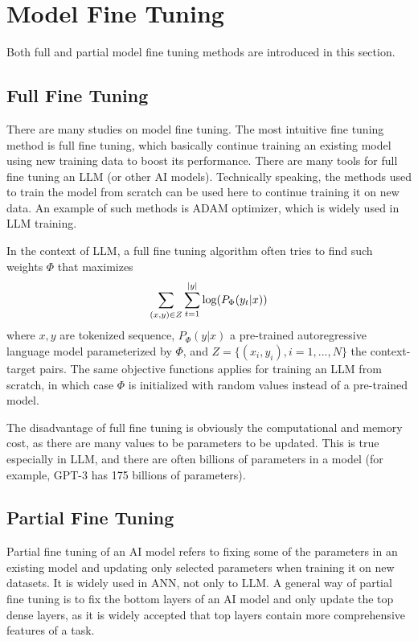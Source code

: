 \section{Model Fine Tuning}

Both full and partial model fine tuning methods are introduced in this section.

\subsection{Full Fine Tuning}

There are many studies on model fine tuning. The most intuitive fine tuning method is full fine tuning, which basically continue training an existing model using new training data to boost its performance. There are many tools for full fine tuning an LLM (or other AI models). Technically speaking, the methods used to train the model from scratch can be used here to continue training it on new data. An example of such methods is ADAM optimizer, which is widely used in LLM training.

In the context of LLM, a full fine tuning algorithm often tries to find such weights $\Phi$ that maximizes
\begin{eqnarray}
	\sum_{(x,y)\in Z}\sum_{t=1}^{|y|} \textup{log}(P_{\Phi}(y_t|x)) \nonumber
\end{eqnarray}
where $x, y$ are tokenized sequence, $P_{\Phi}(y|x)$ a pre-trained autoregressive language model parameterized by $\Phi$, and $Z=\{(x_i,y_i), i=1,...,N\}$ the context-target pairs. The same objective functions applies for training an LLM from scratch, in which case $\Phi$ is initialized with random values instead of a pre-trained model.

The disadvantage of full fine tuning is obviously the computational and memory cost, as there are many values to be parameters to be updated. This is true especially in LLM, and there are often billions of parameters in a model (for example, GPT-3 has 175 billions of parameters).

\subsection{Partial Fine Tuning}

Partial fine tuning of an AI model refers to fixing some of the parameters in an existing model and updating only selected parameters when training it on new datasets. It is widely used in ANN, not only to LLM. A general way of partial fine tuning is to fix the bottom layers of an AI model and only update the top dense layers, as it is widely accepted that top layers contain more comprehensive features of a task.


